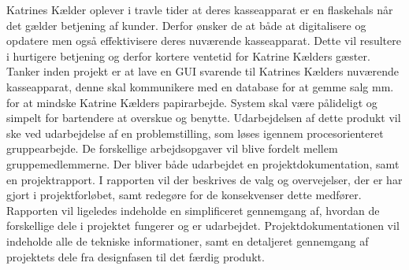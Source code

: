 Katrines Kælder oplever i travle tider at deres kasseapparat er en flaskehals når det gælder betjening af kunder. Derfor ønsker de at både at digitalisere og opdatere men også effektivisere deres nuværende kasseapparat. Dette vil resultere i hurtigere betjening og derfor kortere ventetid for Katrine Kælders gæster.
\newline
\newline
Tanker inden projekt er at lave en GUI svarende til Katrines Kælders nuværende kasseapparat, denne skal kommunikere med en database for at gemme salg mm. for at mindske Katrine Kælders papirarbejde. System skal være pålideligt og simpelt for bartendere at overskue og benytte.
\newline
\newline
Udarbejdelsen af dette produkt vil ske ved udarbejdelse af en problemstilling, som løses igennem procesorienteret gruppearbejde. De forskellige arbejdsopgaver vil blive fordelt mellem gruppemedlemmerne. Der bliver både udarbejdet en projektdokumentation, samt en projektrapport.
\newline
\newline
I rapporten vil der beskrives de valg og overvejelser, der er har gjort i projektforløbet, samt redegøre for de konsekvenser dette medfører. Rapporten vil ligeledes indeholde en simplificeret gennemgang af,
hvordan de forskellige dele i projektet fungerer og er udarbejdet.
\newline
\newline
Projektdokumentationen vil indeholde alle de tekniske informationer, samt en detaljeret gennemgang af projektets
dele fra designfasen til det færdig produkt.










   